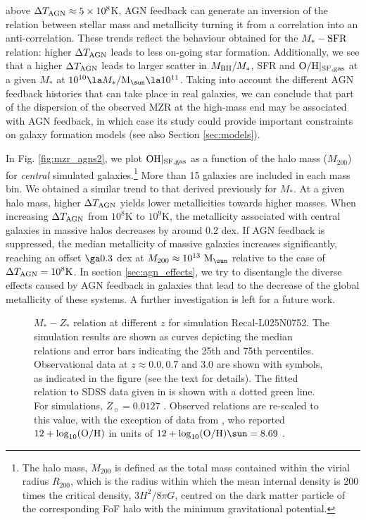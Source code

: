 \documentclass[useAMS,usenatbib]{mn2e}
\begin{document}
above $\Delta T_{\rm AGN} \approx 5 \times 10^8$K,
AGN feedback can generate an inversion of the relation between stellar mass and metallicity 
turning it from a correlation into an anti-correlation. These trends reflect the behaviour obtained for the
$M_* - {\rm SFR}$ relation: higher $\Delta T_{\rm AGN}$ leads to less on-going star formation.
Additionally, we see that a 
higher $\Delta T_{\rm AGN}$ leads to larger scatter in $M_{\rm BH}/M_*$, SFR and ${\rm O/H}|_{\rm SF,gas}$ at a given $M_*$ 
at $10^{10} \la M_* / {\rm M}_{\sun} \la 10^{11}$.
Taking into account the different AGN feedback histories that can take place in real galaxies, we can conclude
that part of the dispersion of the observed MZR at the high-mass end 
may be associated with AGN feedback,
in which case its study could provide important constraints on galaxy formation models (see also Section \ref{sec:models}).

In Fig. \ref{fig:mzr_agns2}, we plot ${\rm OH}|_{\rm SF,gas}$ as a function of the
halo mass ($M_{200}$) for {\em central} simulated galaxies.\footnote{The halo mass, $M_{200}$ is defined as
the total mass contained within the virial radius $R_{200}$, which is
the radius within which the mean internal density is 200 times
the critical density, $3H^{2}/8 \pi G$, centred on the dark matter particle
of the corresponding FoF halo with the minimum gravitational
potential.}
More than 15 galaxies are included in each mass bin.
We obtained a similar trend to that derived previously for $M_*$.
At a given halo mass, higher $\Delta T_{\rm AGN}$ yields lower metallicities towards higher masses.
When increasing $\Delta T_{\rm AGN}$ from $10^8$K to $10^9$K, the metallicity associated with central
galaxies in massive halos decreases by around $0.2$ dex.
If AGN feedback is suppressed, the median metallicity of massive galaxies increases significantly,
reaching an offset $\ga 0.3$ dex at $M_{200} \approx 10^{13} \ {\rm M}_{\sun}$
relative to the case of $\Delta T_{\rm AGN}=10^8 {\rm K}$.
In section \ref{sec:agn_effects}, we try to disentangle the diverse effects caused by AGN
feedback in galaxies that lead to the decrease of the global metallicity of these systems.
A further investigation is left for a future work.

\begin{figure}
\begin{center}
\end{center}
\caption[]
{
$M_* - Z_*$ relation at different $z$ for simulation Recal-L025N0752.  The simulation results are
shown as curves depicting the median relations and error bars indicating the 25th and 75th
percentiles. Observational data at $z\approx 0.0, 0.7$ and 3.0 are shown with symbols, as indicated
in the figure (see the text for details).   
The fitted relation to SDSS data given in \citet{panter2008} is shown with a dotted green line.
For simulations, $Z_{\sun} = 0.0127$ \citep{wiersma2009b}. Observed relations are re-scaled to this
value, with the exception of data from \citet{sommariva2011}, who reported $12+ \log_{10} ({\rm O/H})$ in units of
$12+ \log_{10} ({\rm O/H})\sun = 8.69$ \citep{allende2001}.
}
\label{fig:mzr_stars}
\end{figure}
\end{document}
